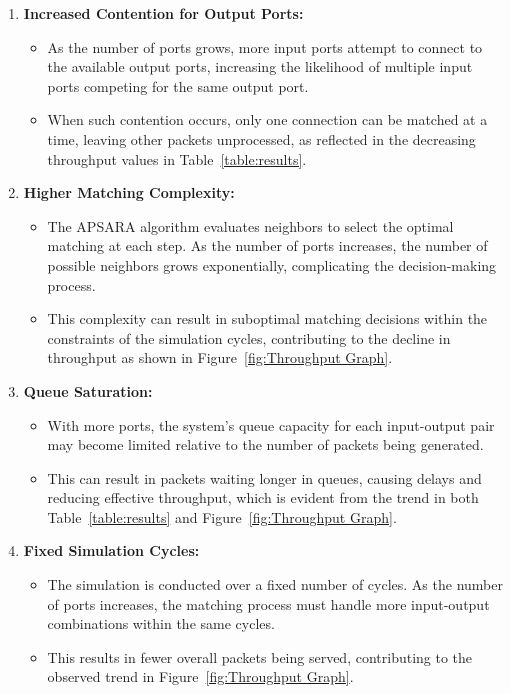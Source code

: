 \documentclass[12pt	]{article}
\begin{document}
\begin{enumerate}
	\item \textbf{Increased Contention for Output Ports:}
	\begin{itemize}
		\item As the number of ports grows, more input ports attempt to connect to the available output ports, increasing the likelihood of multiple input ports competing for the same output port.
		\item When such contention occurs, only one connection can be matched at a time, leaving other packets unprocessed, as reflected in the decreasing throughput values in {Table~\ref{table:results}}.
	\end{itemize}
	
	\item \textbf{Higher Matching Complexity:}
	\begin{itemize}
		\item The APSARA algorithm evaluates neighbors to select the optimal matching at each step. As the number of ports increases, the number of possible neighbors grows exponentially, complicating the decision-making process.
		\item This complexity can result in suboptimal matching decisions within the constraints of the simulation cycles, contributing to the decline in throughput as shown in {Figure~\ref{fig:Throughput Graph}}.
	\end{itemize}
	
	\item \textbf{Queue Saturation:}
	\begin{itemize}
		\item With more ports, the system's queue capacity for each input-output pair may become limited relative to the number of packets being generated.
		\item This can result in packets waiting longer in queues, causing delays and reducing effective throughput, which is evident from the trend in both {Table~\ref{table:results}} and {Figure~\ref{fig:Throughput Graph}}.
	\end{itemize}
	
	\item \textbf{Fixed Simulation Cycles:}
	\begin{itemize}
		\item The simulation is conducted over a fixed number of cycles. As the number of ports increases, the matching process must handle more input-output combinations within the same cycles.
		\item This results in fewer overall packets being served, contributing to the observed trend in {Figure~\ref{fig:Throughput Graph}}.
	\end{itemize}
	

\end{enumerate}
\end{document}
